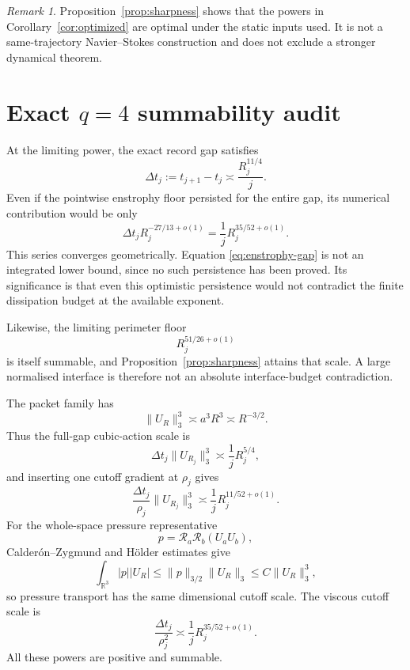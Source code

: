 \documentclass[11pt]{article}
\theoremstyle{remark}
\newtheorem{remark}[theorem]{Remark}
\newcommand{\R}{\mathbb R}
\begin{document}
\begin{remark}
Proposition~\ref{prop:sharpness} shows that the powers in
Corollary~\ref{cor:optimized} are optimal under the static inputs used.
It is not a same-trajectory Navier--Stokes construction and does not
exclude a stronger dynamical theorem.
\end{remark}

\section{Exact \texorpdfstring{\(q=4\)}{q=4} summability audit}

At the limiting power, the exact record gap satisfies
\begin{equation}
 \label{eq:gap}
 \Delta t_j:=t_{j+1}-t_j
 \asymp\frac{R_j^{11/4}}j.
\end{equation}
Even if the pointwise enstrophy floor persisted for the entire gap, its
numerical contribution would be only
\begin{equation}
 \label{eq:enstrophy-gap}
 \Delta t_jR_j^{-27/13+o(1)}
 =
 \frac1jR_j^{35/52+o(1)}.
\end{equation}
This series converges geometrically.  Equation
\eqref{eq:enstrophy-gap} is not an integrated lower bound, since no such
persistence has been proved.  Its significance is that even this
optimistic persistence would not contradict the finite dissipation budget
at the available exponent.

Likewise, the limiting perimeter floor
\[
 R_j^{51/26+o(1)}
\]
is itself summable, and Proposition~\ref{prop:sharpness} attains that
scale.  A large normalised interface is therefore not an absolute
interface-budget contradiction.

The packet family has
\[
 \|U_R\|_3^3\asymp a^3R^3\asymp R^{-3/2}.
\]
Thus the full-gap cubic-action scale is
\begin{equation}
 \label{eq:cubic-gap}
 \Delta t_j\|U_{R_j}\|_3^3
 \asymp\frac1jR_j^{5/4},
\end{equation}
and inserting one cutoff gradient at \(\rho_j\) gives
\begin{equation}
 \label{eq:flux-gap}
 \frac{\Delta t_j}{\rho_j}\|U_{R_j}\|_3^3
 \asymp\frac1jR_j^{11/52+o(1)}.
\end{equation}
For the whole-space pressure representative
\[
 p=\mathcal R_a\mathcal R_b(U_aU_b),
\]
Calder\'on--Zygmund and H\"older estimates give
\[
 \int_{\R^3}|p||U_R|
 \le
 \|p\|_{3/2}\|U_R\|_3
 \le C\|U_R\|_3^3,
\]
so pressure transport has the same dimensional cutoff scale.  The
viscous cutoff scale is
\begin{equation}
 \label{eq:viscous-gap}
 \frac{\Delta t_j}{\rho_j^2}
 \asymp\frac1jR_j^{35/52+o(1)}.
\end{equation}
All these powers are positive and summable.
\end{document}
